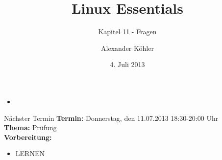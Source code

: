 \documentclass[aspectratio=43]{beamer}
\title[Linux Essentials  - Kapitel 11 - Fragen]{Linux Essentials}
\subtitle{Kapitel 11 - Fragen}
\author{Alexander Köhler}
\date{4. Juli 2013}
\begin{document}
\logoframe

\frame{\titlepage}


\setcounter{tocdepth}{1}
\section[Gliederung]{}
\frame{\tableofcontents}



\begin{frame}{}
  \begin{block}{}
    \begin{itemize}
      \item 
    \end{itemize}
  \end{block}
\end{frame}

\begin{frame}[plain]
  \begin{alertblock}{Nächster Termin}
    \textbf{Termin:} Donnerstag, den 11.07.2013 18:30-20:00 Uhr\\
    \textbf{Thema:} \Huge{Prüfung}\\
    \textbf{Vorbereitung:} 
    \begin{itemize}
      \item LERNEN
    \end{itemize}
  \end{alertblock}
\end{frame}


\materialframe
\end{document}
